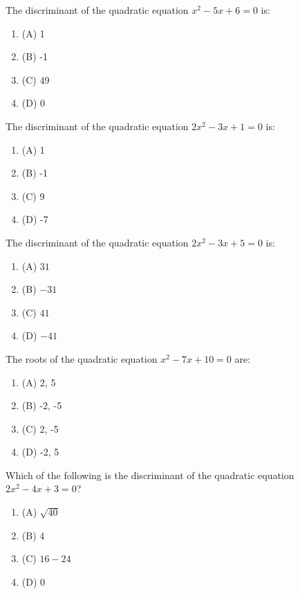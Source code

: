 \documentclass[12pt,a4paper]{exam}
\begin{document}
\begin{questions}
\question[1] The discriminant of the quadratic equation $x^2 - 5x + 6 = 0$ is:
\begin{enumerate}[label=(\Alph*)]
  \item (A) 1
  \item (B) -1
  \item (C) 49
  \item (D) 0
\end{enumerate}
\vspace{0.15cm}

\question[1] The discriminant of the quadratic equation $2x^2 - 3x + 1 = 0$ is:
\begin{enumerate}[label=(\Alph*)]
  \item (A) 1
  \item (B) -1
  \item (C) 9
  \item (D) -7
\end{enumerate}
\vspace{0.15cm}

\question[1] The discriminant of the quadratic equation $2x^2 - 3x + 5 = 0$ is:
\begin{enumerate}[label=(\Alph*)]
  \item (A) $31$
  \item (B) $-31$
  \item (C) $41$
  \item (D) $-41$
\end{enumerate}
\vspace{0.15cm}

\question[1] The roots of the quadratic equation $x^2 - 7x + 10 = 0$ are:
\begin{enumerate}[label=(\Alph*)]
  \item (A) 2, 5
  \item (B) -2, -5
  \item (C) 2, -5
  \item (D) -2, 5
\end{enumerate}
\vspace{0.15cm}

\question[1] Which of the following is the discriminant of the quadratic equation $2x^2 - 4x + 3 = 0$?
\begin{enumerate}[label=(\Alph*)]
  \item (A) $\sqrt{40}$
  \item (B) $4$
  \item (C) $16 - 24$
  \item (D) $0$
\end{enumerate}
\vspace{0.15cm}


\end{questions}
\end{document}
